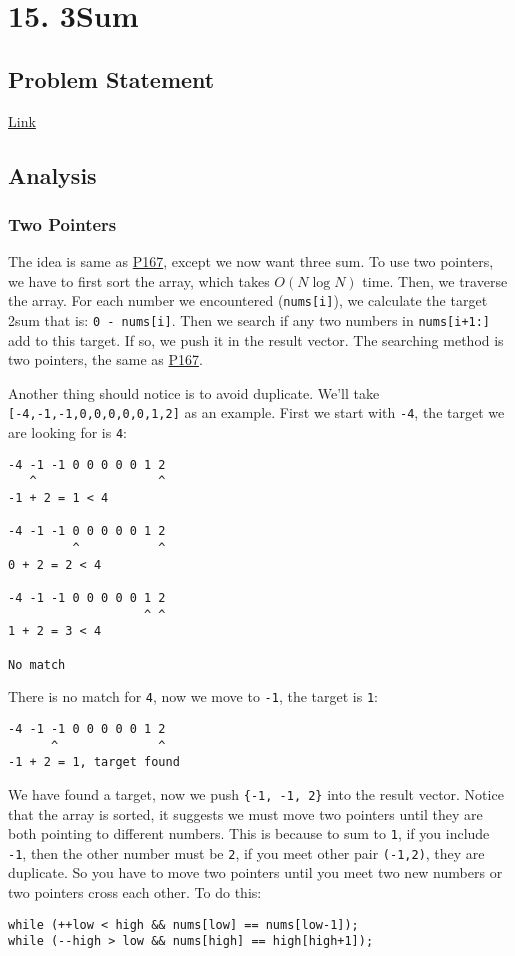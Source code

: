 \documentclass[11pt]{article}
\begin{document}
\section{15. 3Sum}
\label{sec:org577bf3f}
\subsection{Problem Statement}
\label{sec:org9e3db3f}
\href{https://leetcode.com/problems/3sum/}{Link}
\subsection{Analysis}
\label{sec:org49a9aa1}
\subsubsection{Two Pointers}
\label{sec:org1ef5697}
The idea is same as \hyperref[org0ed3772]{P167}, except we now want three sum. To use two pointers, we have to first sort the array, which takes \(O(N\log{N})\) time. Then, we traverse the array. For each number we encountered (\texttt{nums[i]}), we calculate the target 2sum that is: \texttt{0 - nums[i]}. Then we search if any two numbers in \texttt{nums[i+1:]} add to this target. If so, we push it in the result vector. The searching method is two pointers, the same as \hyperref[org0ed3772]{P167}.

Another thing should notice is to avoid duplicate. We'll take \texttt{[-4,-1,-1,0,0,0,0,0,1,2]} as an example. First we start with \texttt{-4}, the target we are looking for is \texttt{4}:
\begin{Verbatim}[frame=single]
-4 -1 -1 0 0 0 0 0 1 2
   ^                 ^
-1 + 2 = 1 < 4

-4 -1 -1 0 0 0 0 0 1 2
         ^           ^
0 + 2 = 2 < 4

-4 -1 -1 0 0 0 0 0 1 2
                   ^ ^
1 + 2 = 3 < 4

No match
\end{Verbatim}

There is no match for \texttt{4}, now we move to \texttt{-1}, the target is \texttt{1}:
\begin{Verbatim}[frame=single]
-4 -1 -1 0 0 0 0 0 1 2
      ^              ^
-1 + 2 = 1, target found
\end{Verbatim}
We have found a target, now we push \texttt{\{-1, -1, 2\}} into the result vector. Notice that the array is sorted, it suggests we must move two pointers until they are both pointing to different numbers. This is because to sum to \texttt{1}, if you include \texttt{-1}, then the other number must be \texttt{2}, if you meet other pair \texttt{(-1,2)}, they are duplicate. So you have to move two pointers until you meet two new numbers or two pointers cross each other. To do this:
\begin{verbatim}
while (++low < high && nums[low] == nums[low-1]);
while (--high > low && nums[high] == high[high+1]);
\end{verbatim}
\end{document}
